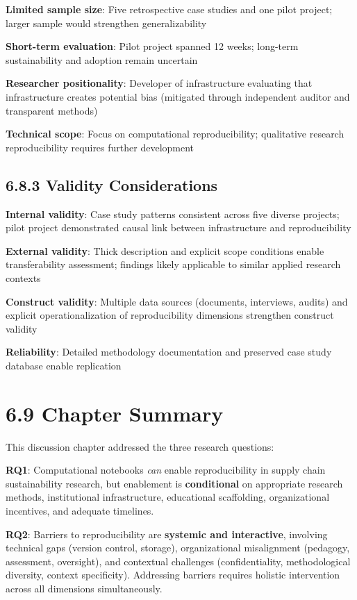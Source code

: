 \documentclass[
  oneside,
  open=any]{scrbook}
\begin{document}
\textbf{Limited sample size}: Five retrospective case studies and one
pilot project; larger sample would strengthen generalizability

\textbf{Short-term evaluation}: Pilot project spanned 12 weeks;
long-term sustainability and adoption remain uncertain

\textbf{Researcher positionality}: Developer of infrastructure
evaluating that infrastructure creates potential bias (mitigated through
independent auditor and transparent methods)

\textbf{Technical scope}: Focus on computational reproducibility;
qualitative research reproducibility requires further development

\subsection{6.8.3 Validity
Considerations}\label{validity-considerations}

\textbf{Internal validity}: Case study patterns consistent across five
diverse projects; pilot project demonstrated causal link between
infrastructure and reproducibility

\textbf{External validity}: Thick description and explicit scope
conditions enable transferability assessment; findings likely applicable
to similar applied research contexts

\textbf{Construct validity}: Multiple data sources (documents,
interviews, audits) and explicit operationalization of reproducibility
dimensions strengthen construct validity

\textbf{Reliability}: Detailed methodology documentation and preserved
case study database enable replication

\section{6.9 Chapter Summary}\label{chapter-summary-4}

This discussion chapter addressed the three research questions:

\textbf{RQ1}: Computational notebooks \emph{can} enable reproducibility
in supply chain sustainability research, but enablement is
\textbf{conditional} on appropriate research methods, institutional
infrastructure, educational scaffolding, organizational incentives, and
adequate timelines.

\textbf{RQ2}: Barriers to reproducibility are \textbf{systemic and
interactive}, involving technical gaps (version control, storage),
organizational misalignment (pedagogy, assessment, oversight), and
contextual challenges (confidentiality, methodological diversity,
context specificity). Addressing barriers requires holistic intervention
across all dimensions simultaneously.
\end{document}
